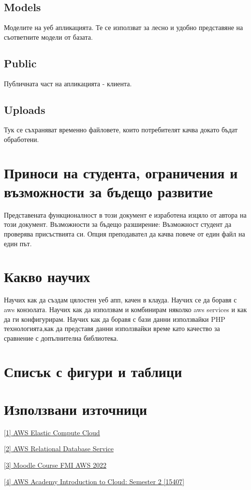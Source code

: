 \documentclass[12pt]{article}
\begin{document}
\subsection{Models}
Моделите на уеб апликацията. Те се използват за лесно и удобно представяне на съответните модели от базата.
\subsection{Public}
Публичната част на апликацията - клиента. 
\subsection{Uploads}
Тук се съхраняват временно файловете, които потребителят качва докато бъдат обработени.
\medskip


\section{Приноси на студента, ограничения и възможности за бъдещо развитие}

Представената функционалност в този документ е изработена изцяло от автора на този документ. Възможности за бъдещо разширение:
Възможност студент да проверява присъствията си.
Опция преподавател да качва повече от един файл на един път.

\section{Какво научих}
Научих как да  създам цялостен уеб апп, качен в клауда. Научих се да боравя с aws конзолата. Научих как да използвам и комбинирам няколко aws services и как да ги конфигурирам. Научих как да боравя с бази данни използвайки PHP технологията,как да представя данни използвайки време като качество за сравнение с допълнителна библиотека.
\section{Списък с фигури и таблици}

\listoftables

\listoffigures

\section{Използвани източници}
\noindent\href{https://aws.amazon.com/ec2/}{[1] AWS Elastic Compute Cloud}

\noindent\href{https://aws.amazon.com/rds/}{[2] AWS Relational Database Service}

\noindent\href{https://learn.fmi.uni-sofia.bg/course/view.php?id=8205}{[3] Moodle Course FMI AWS 2022}

\noindent\href{https://awsacademy.instructure.com/courses/15407}{[4] AWS Academy Introduction to Cloud: Semester 2 [15407]}
\end{document}
